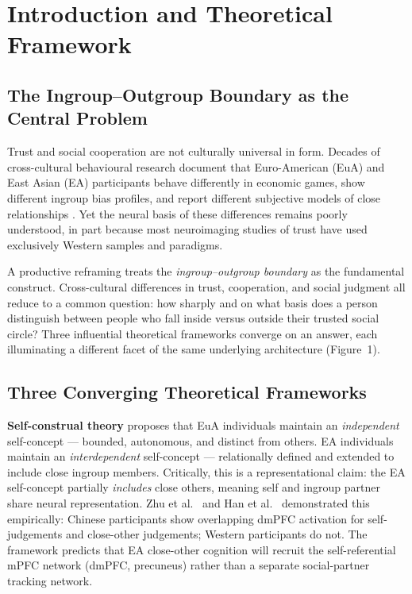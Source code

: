 \documentclass[11pt,a4paper]{article}
\begin{document}
\section{Introduction and Theoretical Framework}

\subsection{The Ingroup--Outgroup Boundary as the Central Problem}

Trust and social cooperation are not culturally universal in form. Decades of cross-cultural
behavioural research document that Euro-American (EuA) and East Asian (EA) participants behave
differently in economic games, show different ingroup bias profiles, and report different
subjective models of close relationships \citep{Triandis1995,Yamagishi1994,Markus1991}. Yet
the neural basis of these differences remains poorly understood, in part because most neuroimaging
studies of trust have used exclusively Western samples and paradigms.

A productive reframing treats the \emph{ingroup--outgroup boundary} as the fundamental construct.
Cross-cultural differences in trust, cooperation, and social judgment all reduce to a common
question: how sharply and on what basis does a person distinguish between people who fall inside
versus outside their trusted social circle? Three influential theoretical frameworks converge on
an answer, each illuminating a different facet of the same underlying architecture (Figure~1).

\subsection{Three Converging Theoretical Frameworks}

\textbf{Self-construal theory} \citep{Markus1991} proposes that EuA individuals maintain an
\emph{independent} self-concept — bounded, autonomous, and distinct from others. EA individuals
maintain an \emph{interdependent} self-concept — relationally defined and extended to include
close ingroup members. Critically, this is a representational claim: the EA self-concept partially
\emph{includes} close others, meaning self and ingroup partner share neural representation.
Zhu et al.\ \citeyear{Zhu2007} and Han et al.\ \citeyear{Han2012} demonstrated this empirically:
Chinese participants show overlapping dmPFC activation for self-judgements and close-other
judgements; Western participants do not. The framework predicts that EA close-other cognition
will recruit the self-referential mPFC network (dmPFC, precuneus) rather than a separate
social-partner tracking network.
\end{document}
